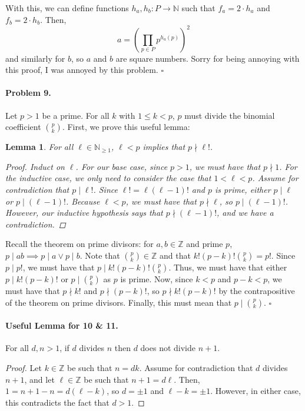 \documentclass[12pt]{article}
\newtheorem{lemma}[theorem]{Lemma}
\begin{document}
With this, we can define functions $h_a, h_b : P \to \mathbb N$ such that $f_a = 2\cdot h_a$ and $f_b = 2\cdot h_b$. Then,
\[a = \left(\prod_{p \in P} p^{h_a(p)}\right)^2\]
and similarly for $b$, so $a$ and $b$ are square numbers. Sorry for being annoying with this proof, I was annoyed by this problem. $\square$

\paragraph{Problem 9.} Let $p>1$ be a prime. For all $k$ with $1 \le k < p$, $p$ must divide the binomial coefficient $\binom{p}{k}$. First, we prove this useful lemma:

\begin{lemma}
    For all $\ell \in \mathbb N_{\ge 1}$, $\ell < p$ implies that $p \nmid \ell!$. 
    
    \begin{proof}
    Induct on $\ell$. For our base case, since $p >1$, we must have that $p \nmid 1$. For the inductive case, we only need to consider the case that $1 < \ell < p$. Assume for contradiction that $p \mid \ell!$. Since $\ell! = \ell (\ell-1)!$ and $p$ is prime, either $p \mid \ell$ or $p \mid (\ell-1)!$. Because $\ell < p$, we must have that $p \nmid \ell$, so $p \mid (\ell - 1)!$. However, our inductive hypothesis says that $p \nmid (\ell - 1)!$, and we have a contradiction.
    \end{proof}
\end{lemma}

    Recall the theorem on prime divisors: for $a,b \in \mathbb Z$ and prime $p$, $p \mid ab \implies p \mid a \lor p \mid b$. Note that $\binom{p}{k} \in \mathbb Z$ and that $k! (p-k)! \binom{p}{k} = p!$. Since $p \mid p!$, we must have that $p \mid k! (p-k)! \binom{p}{k}$. Thus, we must have that either $p \mid k!(p-k)!$ or $p \mid \binom{p}{k}$ as $p$ is prime. Now, since $k < p$ and $p - k < p$, we must have that $p \nmid k!$ and $p \nmid (p-k)!$, so $p \nmid k!(p-k)!$ by the contrapositive of the theorem on prime divisors. Finally, this must mean that $p \mid \binom{p}{k}$. $\square$


    \newpage{}
\paragraph{Useful Lemma for 10 \& 11.} For all $d,n > 1$, if $d$ divides $n$ then $d$ does not divide $n+1$. 
\begin{proof}
Let $k \in \mathbb Z$ be such that $n = dk$. Assume for contradiction that $d$ divides $n+1$, and let $\ell \in \mathbb Z$ be such that $n+1=d\ell$. Then, $1 = n+1-n = d(\ell-k)$, so $d= \pm 1$ and $\ell-k = \pm 1$. However, in either case, this contradicts the fact that $d > 1$.
\end{proof}
\end{document}
